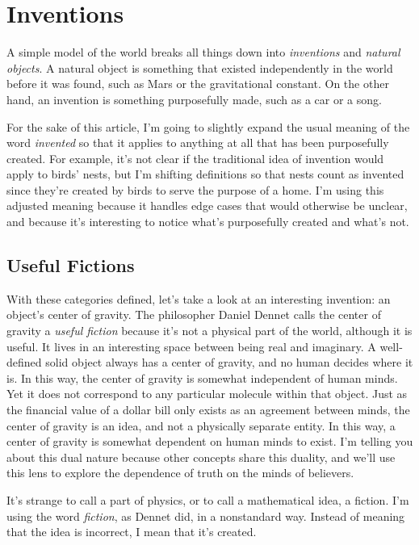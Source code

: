 \documentclass[11pt, oneside]{article}
\theoremstyle{argtstyle}
\begin{document}
\section{Inventions}

A simple model of the world breaks all things down into {\em inventions} and
{\em natural objects}.
A natural object is something that existed independently in the
world before it was found, such as Mars or the gravitational constant.
On the other hand, an
invention is something purposefully made, such as
a car or a song.

For the sake of this article, I'm going to slightly expand
the usual meaning of the word {\em invented} so that it applies
to anything at all that has been purposefully created.
For example,
it's not clear if the traditional idea of invention would apply to birds' nests,
but I'm shifting definitions so that nests count as invented since
they're
created by birds to serve the purpose of a
home.
I'm using this adjusted meaning because it handles edge cases that would
otherwise be unclear, and because it's interesting to notice
what's purposefully created and what's not.

\subsection{Useful Fictions}

With these categories defined,
let's take a look at an interesting invention: an object's
center of gravity.
The philosopher Daniel Dennet calls the center of gravity
a {\em useful fiction}
because it's not a physical part of the world, although it is useful.
It lives in an interesting space between being real and imaginary.
A well-defined solid object always has a center of gravity,
and no human decides where it is.
In this way, the center of gravity
is somewhat independent of human minds.
Yet it does not correspond to any particular molecule within that object.
Just as the financial value of a dollar bill only exists as an agreement between
minds, the center of gravity is an idea, and not a physically separate
entity.
In this way, a center of gravity is somewhat dependent
on human minds to exist.
I'm telling you about this dual nature because
other concepts share this duality, and we'll use this lens to explore
the dependence of truth on the minds of believers.

It's strange to call a part of physics, or to call a mathematical idea, a
fiction. 
I'm using the word {\em fiction}, as Dennet did, in a
nonstandard way.
Instead of meaning that the idea is incorrect, I mean that it's created.
\end{document}

